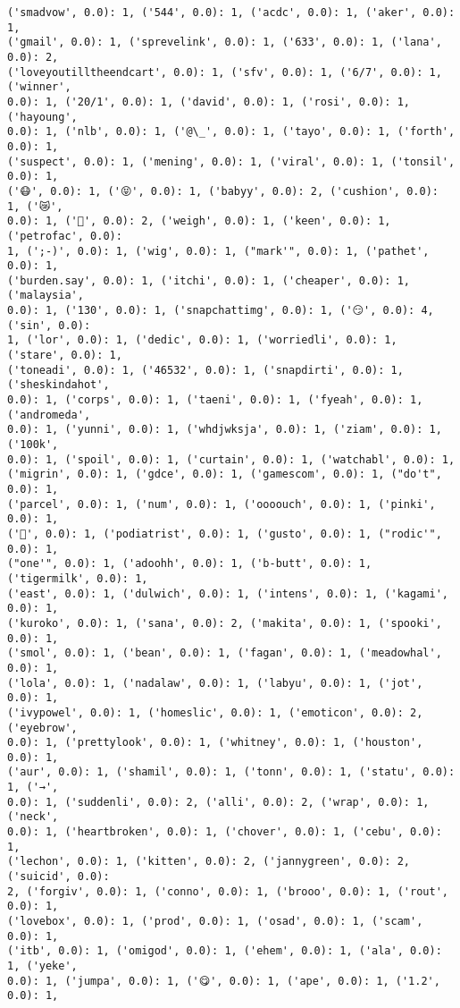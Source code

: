 \documentclass[11pt]{article}
\begin{document}
\begin{Verbatim}[commandchars=\\\{\}]
('smadvow', 0.0): 1, ('544', 0.0): 1, ('acdc', 0.0): 1, ('aker', 0.0): 1,
('gmail', 0.0): 1, ('sprevelink', 0.0): 1, ('633', 0.0): 1, ('lana', 0.0): 2,
('loveyoutilltheendcart', 0.0): 1, ('sfv', 0.0): 1, ('6/7', 0.0): 1, ('winner',
0.0): 1, ('20/1', 0.0): 1, ('david', 0.0): 1, ('rosi', 0.0): 1, ('hayoung',
0.0): 1, ('nlb', 0.0): 1, ('@\_', 0.0): 1, ('tayo', 0.0): 1, ('forth', 0.0): 1,
('suspect', 0.0): 1, ('mening', 0.0): 1, ('viral', 0.0): 1, ('tonsil', 0.0): 1,
('😷', 0.0): 1, ('😝', 0.0): 1, ('babyy', 0.0): 2, ('cushion', 0.0): 1, ('😿',
0.0): 1, ('💓', 0.0): 2, ('weigh', 0.0): 1, ('keen', 0.0): 1, ('petrofac', 0.0):
1, (';-)', 0.0): 1, ('wig', 0.0): 1, ("mark'", 0.0): 1, ('pathet', 0.0): 1,
('burden.say', 0.0): 1, ('itchi', 0.0): 1, ('cheaper', 0.0): 1, ('malaysia',
0.0): 1, ('130', 0.0): 1, ('snapchattimg', 0.0): 1, ('😏', 0.0): 4, ('sin', 0.0):
1, ('lor', 0.0): 1, ('dedic', 0.0): 1, ('worriedli', 0.0): 1, ('stare', 0.0): 1,
('toneadi', 0.0): 1, ('46532', 0.0): 1, ('snapdirti', 0.0): 1, ('sheskindahot',
0.0): 1, ('corps', 0.0): 1, ('taeni', 0.0): 1, ('fyeah', 0.0): 1, ('andromeda',
0.0): 1, ('yunni', 0.0): 1, ('whdjwksja', 0.0): 1, ('ziam', 0.0): 1, ('100k',
0.0): 1, ('spoil', 0.0): 1, ('curtain', 0.0): 1, ('watchabl', 0.0): 1,
('migrin', 0.0): 1, ('gdce', 0.0): 1, ('gamescom', 0.0): 1, ("do't", 0.0): 1,
('parcel', 0.0): 1, ('num', 0.0): 1, ('oooouch', 0.0): 1, ('pinki', 0.0): 1,
('👣', 0.0): 1, ('podiatrist', 0.0): 1, ('gusto', 0.0): 1, ("rodic'", 0.0): 1,
("one'", 0.0): 1, ('adoohh', 0.0): 1, ('b-butt', 0.0): 1, ('tigermilk', 0.0): 1,
('east', 0.0): 1, ('dulwich', 0.0): 1, ('intens', 0.0): 1, ('kagami', 0.0): 1,
('kuroko', 0.0): 1, ('sana', 0.0): 2, ('makita', 0.0): 1, ('spooki', 0.0): 1,
('smol', 0.0): 1, ('bean', 0.0): 1, ('fagan', 0.0): 1, ('meadowhal', 0.0): 1,
('lola', 0.0): 1, ('nadalaw', 0.0): 1, ('labyu', 0.0): 1, ('jot', 0.0): 1,
('ivypowel', 0.0): 1, ('homeslic', 0.0): 1, ('emoticon', 0.0): 2, ('eyebrow',
0.0): 1, ('prettylook', 0.0): 1, ('whitney', 0.0): 1, ('houston', 0.0): 1,
('aur', 0.0): 1, ('shamil', 0.0): 1, ('tonn', 0.0): 1, ('statu', 0.0): 1, ('→',
0.0): 1, ('suddenli', 0.0): 2, ('alli', 0.0): 2, ('wrap', 0.0): 1, ('neck',
0.0): 1, ('heartbroken', 0.0): 1, ('chover', 0.0): 1, ('cebu', 0.0): 1,
('lechon', 0.0): 1, ('kitten', 0.0): 2, ('jannygreen', 0.0): 2, ('suicid', 0.0):
2, ('forgiv', 0.0): 1, ('conno', 0.0): 1, ('brooo', 0.0): 1, ('rout', 0.0): 1,
('lovebox', 0.0): 1, ('prod', 0.0): 1, ('osad', 0.0): 1, ('scam', 0.0): 1,
('itb', 0.0): 1, ('omigod', 0.0): 1, ('ehem', 0.0): 1, ('ala', 0.0): 1, ('yeke',
0.0): 1, ('jumpa', 0.0): 1, ('😋', 0.0): 1, ('ape', 0.0): 1, ('1.2', 0.0): 1,

\end{Verbatim}
\end{document}
